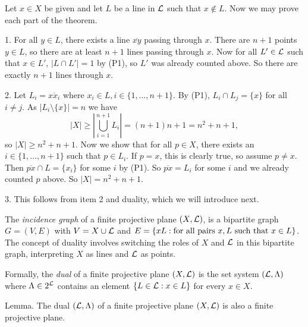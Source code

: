 Let $x\in X$ be given and let $L$ be a line in ${\cal L}$ such that $x\notin L$. Now we may prove each part of the theorem.
\medskip
\item {1.} For all $y\in L$, there exists a line $\overline{xy}$ passing through $x$. There are $n+1$ points $y\in L$, so there are at least $n+1$ lines passing through $x$. Now for all $L'\in{\cal L}$ such that $x\in L'$, $|L\cap L'| = 1$ by (P1), so $L'$ was already counted above. So there are exactly $n+1$ lines through $x$.
\smallskip
\item {2.} Let $L_i = \overline{xx_i}$ where $x_i\in L, i\in\{1,\ldots, n+1\}$. By (P1), $L_i\cap L_j = \{x\}$ for all $i\neq j$. As $|L_i\setminus\{x\}| = n$ we have
    $$|X|\geq |\bigcup_{i=1}^{n+1} L_i| = (n+1)n + 1 = n^2 + n + 1,$$
    so $|X|\geq n^2 + n + 1$.
    Now we show that for all $p\in X$, there exists an $i\in \{1,\ldots,n+1\}$ such that $p\in L_i$. If $p=x$, this is clearly true, so assume $p\neq x$. Then $\overline{px}\cap L = \{x_i\}$ for some $i$ by (P1). So $\overline{px} = L_i$ for some $i$ and we already counted $p$ above. So $|X| = n^2 + n + 1$.
\smallskip
\item {3.} This follows from item 2 and duality, which we will introduce next.\slug

The {\it incidence graph} of a finite projective plane $(X,{\cal L})$, is a bipartite graph $G = (V, E)$ with $V = X\cup {\cal L}$ and $E = \{xL : \hbox{for all pairs}\ x,L\ \hbox{such that}\ x\in L\}$. The concept of duality involves switching the roles of $X$ and ${\cal L}$ in this bipartite graph, interpreting $X$ as lines and ${\cal L}$ as points.

Formally, the {\it dual} of a finite projective plane $(X,{\cal L})$ is the set system $({\cal L}, \Lambda)$ where $\Lambda\in 2^{\cal L}$ contains an element $\{L\in {\cal L} : x\in L\}$ for every $x\in X$.

\proclaim Lemma. The dual $({\cal L}, \Lambda)$ of a finite projective plane $(X,{\cal L})$ is also a finite projective plane.

